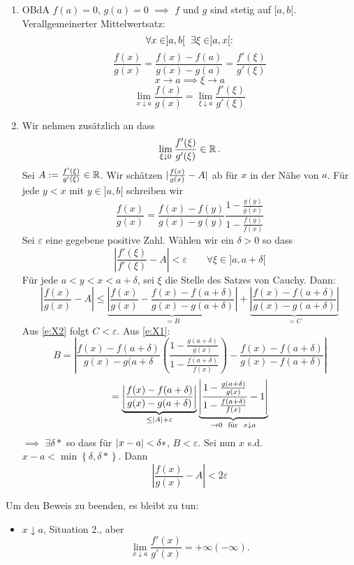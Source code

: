 \begin{Bew}
  \begin{enumerate}
  \item 
      OBdA $f(a)=0$, $g(a)=0$ $\implies$ $f$ und $g$ sind stetig auf $[a,b[$. Verallgemeinerter Mittelwertsatz:
      \[\forall x\in ]a,b[\hspace{2mm}\exists \xi\in ]a,x[:\]
      \[\frac{f(x)}{g(x)}=\frac{f(x)-f(a)}{g(x)-g(a)}=\frac{f'(\xi)}{g'(\xi)}\]
      \[x\to a\implies \xi\to a\]
      \[\lim_{x\downarrow a} \frac{f(x)}{g(x)}=\lim_{\xi\downarrow a} \frac{f'(\xi)}{g'(\xi)}\]
    \item Wir nehmen zus\"atzlich an dass 
\[\lim_{\xi\downarrow 0} \frac{f'(\xi)}{g'(\xi)}\in\mathbb{R}\, .
\]
 Sei $A:=\frac{f'(\xi)}{g'(\xi)}\in\mathbb{R}$. Wir schätzen $\mathopen| \frac{f(x)}{g(x)}-A \mathclose|$ ab für $x$ 
in der Nähe von $a$. F\"ur jede $y<x$ mit $y\in ]a,b[$ schreiben wir
\begin{equation}\label{e:X1}
\frac{f(x)}{g(x)}=\frac{f(x)-f(y)}{g(x)-g(y)}\frac{1-\frac{g(y)}{g(x)}}{1-\frac{f(y)}{f(x)}}
\end{equation}
Sei $\varepsilon$ eine gegebene positive Zahl. Wählen wir ein $\delta>0$ so dass
\begin{equation}\label{e:X2}\left|\frac{f'(\xi)}{f'(\xi)}-A\right|<\varepsilon\qquad\forall 
\xi\in ]a,a+\delta[
\end{equation}
F\"ur jede $a<y<x<a+\delta$, sei $\xi$ die Stelle des Satzes von Cauchy. Dann:     
\[\left|\frac{f(x)}{g(x)}-A\right|\leq \underbrace{\left|
\frac{f(x)}{g(x)}-\frac{f(x)-f(a+\delta)}{g(x)-g(a+\delta)}\right|}_{=B}
+\underbrace{\left|\frac{f(x)-f(a+\delta)}{g(x)-g(a+\delta)}\right|}_{=C}\]
Aus \eqref{e:X2} folgt $C<\varepsilon$. Aus \eqref{e:X1}:
\[B=\left|\frac{f(x)-f(a+\delta)}{g(x)-g(a+\delta}\left( 
\frac{1-\frac{g(a+\delta)}{g(x)}}{1-\frac{f(a+\delta)}{f(x)}} \right)-\frac{f(x)-f(a+\delta)}
{g(x)-f(a+\delta)}\right|\]
      \[=\underbrace{\left|\frac{f(x)-f(a+\delta)}{g(x)-g(a+\delta)}\right|}
_{\leq \mathopen| A \mathclose|+\varepsilon}\underbrace{\left|\frac{1-\frac{g(a+\delta)}{g(x)}}
{1-\frac{f(a+\delta)}{f(x)}}-1\right|}_{\to 0\hspace{2mm}\text{für}\hspace{2mm} x\downarrow a}\]
      $\implies$ $\exists \delta*$ so dass für $\mathopen| x-a \mathclose|<\delta*$, $B<\varepsilon$. 
Sei nun $x$ s.d. $x-a<\min\left\{ \delta,\delta* \right\}$. Dann
      \[\left|\frac{f(x)}{g(x)}-A\right|<2\varepsilon\]
  \end{enumerate}
  Um den Beweis zu beenden, es bleibt zu tun:
  \begin{itemize}
    \item $x\downarrow a$, Situation 2., aber
      \[\lim_{x\downarrow a}\frac{f'(x)}{g'(x)}=+\infty (-\infty).\]

\end{itemize}
\end{Bew}
